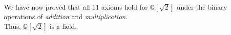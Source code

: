 \documentclass{article}
\begin{document}
\begin{flushleft}
\begin{enumerate}[a)]
\vspace{.5cm}

\qquad We have now proved that all 11 axioms hold for $\mathbb{Q}[\sqrt{2}]$ under the binary operations of \emph{addition} and \emph{multiplication}. \\
\qquad Thus, $\mathbb{Q}[\sqrt{2}]$ is a field.
\end{enumerate}
\end{flushleft}



\end{document}
